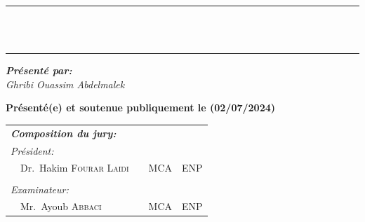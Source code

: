 {\begin{titlepage}
    \vspace{3mm}

    \center


    \vspace{2mm}


    \vspace{3mm}

    \begin{bfseries}
        \rule{\linewidth}{1pt} \\
        \vspace{3mm}
         \\
        \vspace{3mm}
        \rule{\linewidth}{1pt}
    \end{bfseries}

    \begin{flushleft}
        \textit{\textbf{Présenté par:}}      \\
        \textit{Ghribi Ouassim Abdelmalek} \\

    \end{flushleft}

    \begin{flushleft}
        \textbf{Présenté(e) et soutenue publiquement le (02/07/2024)}
    \end{flushleft}

    \begin{flushleft}
        \noindent \large
        \begin{tabular}{llcll}
            \textit{\textbf{Composition du jury:}}                 &  &             &                    \\
            \textit{Président:}                                    &  &             &                    \\
            \multicolumn{2}{l}{~~Dr.\ Hakim \textsc{Fourar Laidi}} &  & MCA         & ENP                \\

            \\
            \textit{Examinateur:}                                  &  &             &                    \\
            \multicolumn{2}{l}{~~Mr.\ Ayoub \textsc{Abbaci}}       &  & MCA         & ENP                \\


\end{tabular}
\end{flushleft}
\end{titlepage}}
